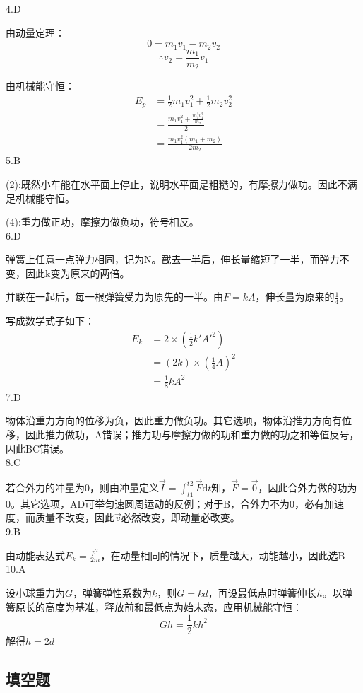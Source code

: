 \documentclass[blue, pad]{./templete/qyxfnote}
\newcommand{\di}[1]{\mathrm{d}#1}
\begin{document}
	4.D\par
	由动量定理：
	\[0=m_1v_1-m_2v_2\]
	\[\therefore{}v_2=\frac{m_1}{m_2}v_1\]\par
	由机械能守恒：
	\begin{align*}
	E_p &=\frac{1}{2}m_1v_1^2+\frac{1}{2}m_2v_2^2\\
	&=\frac{m_1v_1^2+\frac{m_1^2v_1^2}{m_2}}{2}\\
	&=\frac{m_1v_1^2\left(m_1+m_2\right)}{2m_2}
	\end{align*}
	5.B\par
	(2):既然小车能在水平面上停止，说明水平面是粗糙的，有摩擦力做功。因此不满足机械能守恒。\par
	(4):重力做正功，摩擦力做负功，符号相反。\\
	6.D\par
	弹簧上任意一点弹力相同，记为N。截去一半后，伸长量缩短了一半，而弹力不变，因此k变为原来的两倍。\par
	并联在一起后，每一根弹簧受力为原先的一半。由$F=kA$，伸长量为原来的$\frac{1}{4}$。\par
	写成数学式子如下：
	\begin{align*}
	E_k &=2\times\left(\frac{1}{2}k'A'^2\right)\\
	&=\left(2k\right)\times\left(\frac{1}{4}A\right)^2\\
	&=\frac{1}{8}kA^2
	\end{align*}
	7.D\par 
	物体沿重力方向的位移为负，因此重力做负功。其它选项，物体沿推力方向有位移，因此推力做功，A错误；推力功与摩擦力做的功和重力做的功之和等值反号，因此BC错误。\\
	8.C\par 
	若合外力的冲量为0，则由冲量定义$\vec{I}=\int_{t1}^{t2}\vec{F}\di{t}$知，$\vec{F}=\vec{0}$，因此合外力做的功为0。其它选项，AD可举匀速圆周运动的反例；对于B，合外力不为0，必有加速度，而质量不改变，因此$\vec{v}$必然改变，即动量必改变。\\
	9.B\par 
	由动能表达式$E_k=\frac{p^2}{2m}$，在动量相同的情况下，质量越大，动能越小，因此选B\\
	10.A\par 
	设小球重力为$G$，弹簧弹性系数为$k$，则$G=kd$，再设最低点时弹簧伸长$h$。以弹簧原长的高度为基准，释放前和最低点为始末态，应用机械能守恒：
	\[Gh=\frac{1}{2}kh^2\]
	解得$h=2d$
	
	\subsection{填空题}
	
\end{document}
